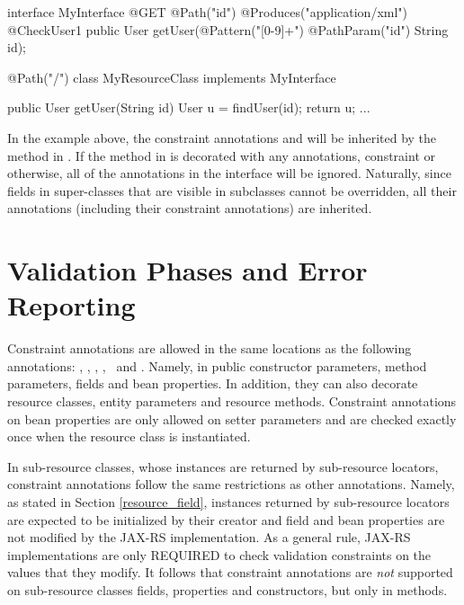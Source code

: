 \begin{listing}{1}
interface MyInterface {
    @GET
    @Path("{id}")
    @Produces("application/xml")
    @CheckUser1
    public User getUser(@Pattern("[0-9]+") @PathParam("id") String id);
}

@Path("/")
class MyResourceClass implements MyInterface {

    public User getUser(String id) {
        User u = findUser(id);
        return u;
    }
    ...
}
\end{listing}

In the example above, the constraint annotations  and  will be inherited by the  method in . If the  method in  is decorated with any annotations, constraint or otherwise, all of the annotations in the interface  will be ignored. Naturally, since fields in super-classes that are visible in subclasses cannot be overridden, all their annotations (including their constraint annotations) are inherited.

\section{Validation Phases and Error Reporting}
\label{validation_phases_and_error_reporting}

Constraint annotations are allowed in the same locations as the following annotations: \MatrixParam, \QueryParam, \PathParam, \CookieParam, \HeaderParam\ and \Context. Namely, in public constructor parameters, method parameters, fields and bean properties. In addition, they can also decorate resource classes, entity parameters and resource methods. Constraint annotations on bean properties are only allowed on setter parameters and are checked exactly once when the resource class is instantiated.

In sub-resource classes, whose instances are returned by sub-resource locators, constraint annotations follow the same restrictions as other annotations. Namely, as stated in Section \ref{resource_field}, instances returned by sub-resource locators are expected to be initialized by their creator and field and bean properties are not modified by the JAX-RS implementation. As a general rule, JAX-RS implementations are only REQUIRED to check validation constraints on the values that they modify. It follows that constraint annotations are \emph{not} supported on sub-resource classes fields, properties and constructors, but only in methods.

